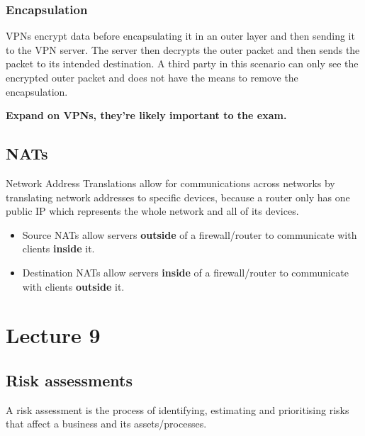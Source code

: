 \documentclass[12pt]{report}
\begin{document}
\subsection{Encapsulation}
VPNs encrypt data before encapsulating it in an outer layer and then sending it to the VPN server. The server then decrypts the outer packet and then sends the packet to its intended destination. A third party in this scenario can only see the encrypted outer packet and does not have the means to remove the encapsulation.

\large\textbf{Expand on VPNs, they're likely important to the exam.}\normalsize

\section{NATs}
Network Address Translations allow for communications across networks by translating network addresses to specific devices,
because a router only has one public IP which represents the whole network and all of its devices.

\begin{multicols}{2}
	\begin{itemize}
		\item Source NATs allow servers \textbf{outside} of a firewall/router to communicate with clients \textbf{inside} it.
		\item Destination NATs allow servers \textbf{inside} of a firewall/router to communicate with clients \textbf{outside} it.
	\end{itemize}
\end{multicols}

\chapter{Lecture 9}
\section{Risk assessments}
A risk assessment is the process of identifying, estimating and prioritising risks that affect a business and its assets/processes.
\end{document}

